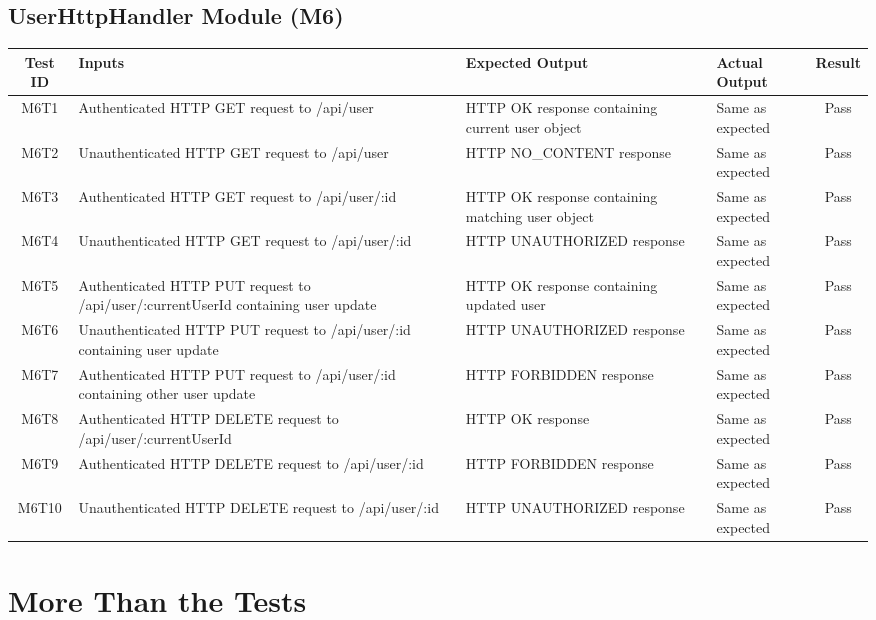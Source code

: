 \documentclass[fullpage]{article}
\begin{document}
\subsection{UserHttpHandler Module (M6)}
\begin{table}[H]
\flushleft
\begin{tabular}{|c|p{4.5cm}|p{3.6cm}|p{3.6cm}|c|}
\hline
 \rowcolor{lightgray} 
\textbf{Test ID} &\textbf{Inputs} &\textbf{Expected Output} &\textbf{Actual Output} &\textbf{Result}\\
\hline
M6T1 & Authenticated HTTP GET request to /api/user & HTTP OK response containing current user object & Same as expected & Pass \\
\hline
M6T2 & Unauthenticated HTTP GET request to /api/user & HTTP NO\_CONTENT response &Same as expected& Pass \\
\hline
M6T3 & Authenticated HTTP GET request to /api/user/:id & HTTP OK response containing matching user object & Same as expected & Pass \\
\hline
M6T4 & Unauthenticated HTTP GET request to /api/user/:id & HTTP UNAUTHORIZED response & Same as expected & Pass \\
\hline
M6T5 & Authenticated HTTP PUT request to /api/user/:currentUserId containing user update & HTTP OK response containing updated user & Same as expected & Pass \\
\hline
M6T6 & Unauthenticated HTTP PUT request to /api/user/:id containing user update & HTTP UNAUTHORIZED response & Same as expected & Pass \\
\hline
M6T7 & Authenticated HTTP PUT request to /api/user/:id containing other user update & HTTP FORBIDDEN response & Same as expected & Pass \\
\hline
M6T8 & Authenticated HTTP DELETE request to /api/user/:currentUserId & HTTP OK response & Same as expected & Pass \\
\hline
M6T9 & Authenticated HTTP DELETE request to /api/user/:id & HTTP FORBIDDEN response & Same as expected & Pass \\
\hline
M6T10 & Unauthenticated HTTP DELETE request to /api/user/:id & HTTP UNAUTHORIZED response & Same as expected & Pass \\
\hline
\end{tabular}
\end{table}

\section{More Than the Tests}
\end{document}
